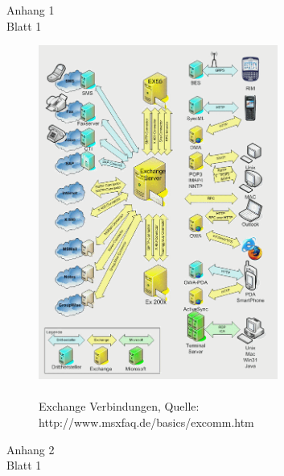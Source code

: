 
\begin{flushright}
Anhang 1\\
Blatt 1\\
\end{flushright}

\begin{figure}[h!]
\centering
\includegraphics[width=0.70\textwidth]{Abbildungen/Exchange_Verbindungen.png}
\caption*{\\Exchange Verbindungen, Quelle: http://www.msxfaq.de/basics/excomm.htm}
\label{Exchange_Verbindungen}
\end{figure}


\newpage

\begin{flushright}
Anhang 2\\
Blatt 1\\
\end{flushright}


